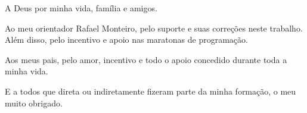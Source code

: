 \begin{agradecimentos}
A Deus por minha vida, família e amigos.

Ao meu orientador Rafael Monteiro, pelo suporte e suas correções neste trabalho. Além disso, pelo incentivo e apoio nas maratonas de programação.

Aos meus pais, pelo amor, incentivo e todo o apoio concedido durante toda a minha vida.

E a todos que direta ou indiretamente fizeram parte da minha formação, o meu muito obrigado.
\end{agradecimentos}
